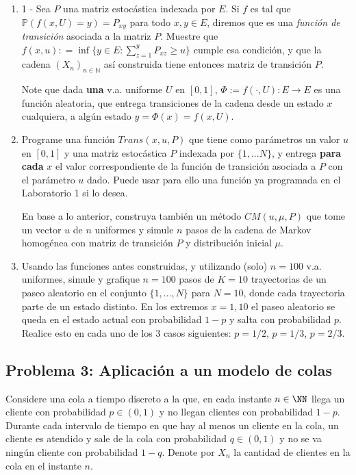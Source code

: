\begin{enumerate}
    \item  1 - Sea $P$ una matriz estocástica  indexada por $E$. Si	$f$ es tal que $ \mathbb{P}(f(x,U)=y)= P_{xy} $ para todo $x,y\in E$, diremos que es una  \textit{función de transición} asociada a la matriz $P$. Muestre que $f(x,u): = \inf \{y\in E : \sum_{z=1}^y P_{xz}\geq u\}$ cumple esa condición, y que   la cadena $(X_n)_{n\in\mathbb{N}}$  así  construida tiene entonces matriz de transición $P$.

    Note que dada \textbf{una} v.a. uniforme $U$ en $[0,1]$, $\Phi:= f(\cdot,  U):E \rightarrow E$  es una función aleatoria,  que entrega transiciones de la cadena desde  un estado $x$ cualquiera, a algún estado $y=\Phi(x)= f(x,  U)$.  
				
    \item  Programe una función $Trans(x,u,P)$ que tiene  como parámetros un valor $u$  en $[0,1]$ y una matriz estocástica $P$ indexada por $\{1,...N\}$, y  entrega \textbf{para cada} $x$ el  valor correspondiente de la función de transición  asociada a $P$ con el parámetro $u$ dado.  Puede usar para ello una función ya programada en el Laboratorio 1 si lo desea.

    En base a lo anterior, construya  también  un método $CM(u,\mu,P)$ que tome un vector $u$ de $n$ uniformes y simule $n$ pasos de la cadena de Markov homogénea con matriz de transición $P$ y distribución inicial $\mu$. 

    \item Usando las funciones antes construidas, y utilizando (solo)  $n=100$ v.a. uniformes,   simule y grafique $n=100$ pasos de  $K=10$ trayectorias de un paseo aleatorio en el conjunto $\{1,...,N\}$ para $N=10$, donde cada trayectoria parte de  un estado distinto. En los extremos $x=1,10$ el paseo aleatorio se queda en el estado actual con probabilidad $1-p$ y salta con probabilidad $p$.  Realice esto  en cada uno de  los 3 casos siguientes: 	 $p=1/2$, $p=1/3$, $p= 2/3$.
\end{enumerate}

\subsection*{Problema 3: Aplicación a un modelo de colas}

Considere una cola a tiempo discreto a la que, en cada instante $n\in \NN$ llega un cliente con probabilidad $p\in (0,1)$ y no llegan clientes con probabilidad $1-p$. Durante cada intervalo de tiempo en que hay al menos un cliente en la cola, un cliente es atendido y sale de la cola con probabilidad $q\in (0,1)$ y no se va ningún cliente con probabilidad $1-q$. Denote por $X_n$ la cantidad de clientes en la cola en el instante $n$.

